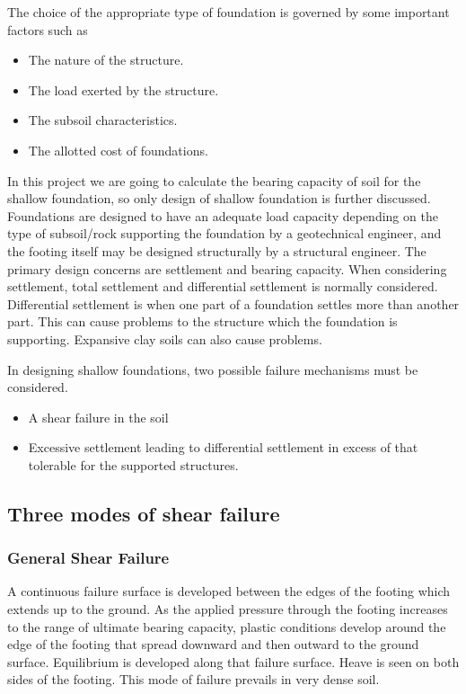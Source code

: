 The choice of the appropriate type of foundation is governed by some important factors such as
\begin{itemize}
	\item The nature of the structure.
	\item The load exerted by the structure.
	\item The subsoil characteristics.
	\item The allotted cost of foundations.
\end{itemize}

In this project we are going to calculate the bearing capacity of soil for the shallow foundation, so only design of shallow foundation is further discussed. Foundations are designed to have an adequate load capacity depending on the type of subsoil/rock supporting the foundation by a geotechnical engineer, and the footing itself may be designed structurally by a structural engineer. The primary design concerns are settlement and bearing capacity. When considering settlement, total settlement and differential settlement is normally considered. Differential settlement is when one part of a foundation settles more than another part. This can cause problems to the structure which the foundation is supporting. Expansive clay soils can also cause problems.

In designing shallow foundations, two possible failure mechanisms must be considered. \cite{dunn_fundamentals_1980}
\begin{itemize}
  \item A shear failure in the soil
  \item Excessive settlement leading to differential settlement in excess of that tolerable for the supported structures.
\end{itemize}

\subsection{Three modes of shear failure}
\subsubsection{General Shear Failure}
A continuous failure surface is developed between the edges of the footing which extends up to the ground. As the applied pressure through the footing increases to the range of ultimate bearing capacity, plastic conditions develop around the edge of the footing that spread downward and then outward to the ground surface. Equilibrium is developed along that failure surface. Heave is seen on both sides of the footing. This mode of failure prevails in very dense soil.
